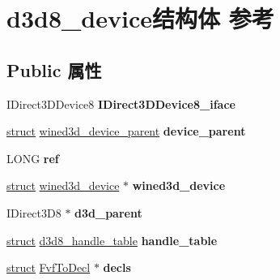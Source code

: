 \hypertarget{structd3d8__device}{}\section{d3d8\+\_\+device结构体 参考}
\label{structd3d8__device}
\subsection*{Public 属性}
\begin{DoxyCompactItemize}
\item 
\mbox{\label{structd3d8__device_a429cbe30d745665a8c54d51624835f70}} 
I\+Direct3\+D\+Device8 {\bfseries I\+Direct3\+D\+Device8\+\_\+iface}
\item 
\mbox{\label{structd3d8__device_acad9ec56710da93126a9948e8c7cd6eb}} 
\hyperlink{interfacestruct}{struct} \hyperlink{structwined3d__device__parent}{wined3d\+\_\+device\+\_\+parent} {\bfseries device\+\_\+parent}
\item 
\mbox{\label{structd3d8__device_a1f509da3ea46683fef1999f330dfc071}} 
L\+O\+NG {\bfseries ref}
\item 
\mbox{\label{structd3d8__device_ac1be755126976d60219d4474ad9c96c1}} 
\hyperlink{interfacestruct}{struct} \hyperlink{structwined3d__device}{wined3d\+\_\+device} $\ast$ {\bfseries wined3d\+\_\+device}
\item 
\mbox{\label{structd3d8__device_a198bc12c7929666abfca3f64cb4a2fbb}} 
I\+Direct3\+D8 $\ast$ {\bfseries d3d\+\_\+parent}
\item 
\mbox{\label{structd3d8__device_a16b04bee219287574955bfe0002c02f6}} 
\hyperlink{interfacestruct}{struct} \hyperlink{structd3d8__handle__table}{d3d8\+\_\+handle\+\_\+table} {\bfseries handle\+\_\+table}
\item 
\mbox{\label{structd3d8__device_a461bc5de16a069403dcf137f8bdd9605}} 
\hyperlink{interfacestruct}{struct} \hyperlink{struct_fvf_to_decl}{Fvf\+To\+Decl} $\ast$ {\bfseries decls}
\item 
\mbox{\label{structd3d8__device_ae36fe6c3449dd23097036f03ae3d9b5a}} 

\end{DoxyCompactItemize}
